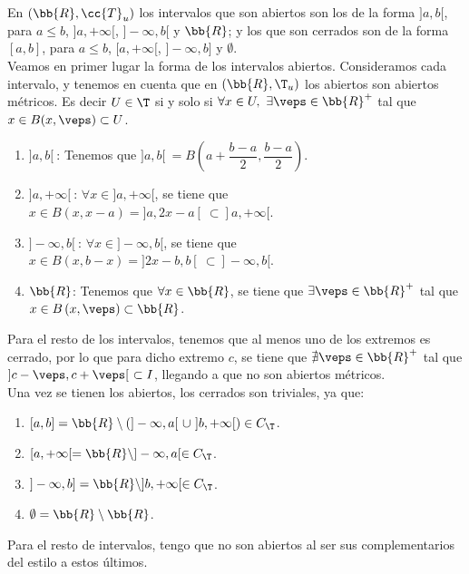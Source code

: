 \begin{ejercicio}
    En $(\bb{R}, \cc{T}_u)$ los intervalos que son abiertos son los de la forma $]a,b[$, para $a\leq b$, $]a,+\infty[$, $]-\infty, b[$ y $\bb{R}$; y los que son cerrados son de la forma $[a,b]$, para $a\leq b$, $[a,+\infty[$, $]-\infty, b]$ y $\emptyset$.\\

    Veamos en primer lugar la forma de los intervalos abiertos. Consideramos cada intervalo, y tenemos en cuenta que en $(\bb{R},\T_u)$ los abiertos son abiertos métricos. Es decir $U\in \T$ si y solo si $\forall x\in U,~\exists \veps\in \bb{R}^+$ tal que $x\in B(x,\veps)\subset U$.
    \begin{enumerate}
        \item $]a,b[~$: Tenemos que $]a,b[~=B\left(a+\dfrac{b-a}{2}, \dfrac{b-a}{2}\right)$.
        \item $]a,+\infty[~$: $\forall x\in ]a,+\infty[$, se tiene que $x\in B\left(x,x-a\right)=]a,2x-a[~\subset ]a,+\infty[$.
        \item $]-\infty,b[~$: $\forall x\in ]-\infty,b[$, se tiene que $x\in B\left(x,b-x\right)=]2x-b,b[~\subset ]-\infty,b[$.
        \item $\bb{R}$: Tenemos que $\forall x\in \bb{R}$, se tiene que $\exists \veps\in \bb{R}^+$ tal que $x\in B\left(x,\veps\right)\subset \bb{R}$.
    \end{enumerate}
    Para el resto de los intervalos, tenemos que al menos uno de los extremos es cerrado, por lo que para dicho extremo $c$, se tiene que $\nexists \veps\in \bb{R}^+$ tal que $]c-\veps, c+\veps[~\subset I$, llegando a que no son abiertos métricos.\\

    Una vez se tienen los abiertos, los cerrados son triviales, ya que:
    \begin{enumerate}
        \item $[a,b]=\bb{R}\setminus \left(]-\infty,a[~\cup~ ]b,+\infty[\right)\in C_\T$.
        \item $[a,+\infty[ = \bb{R}\setminus ]-\infty, a[\in C_\T$.
        \item $]-\infty,b] = \bb{R}\setminus ]b,+\infty[\in C_\T$.
        \item $\emptyset = \bb{R}\setminus \bb{R}$.
    \end{enumerate}
    Para el resto de intervalos, tengo que no son abiertos al ser sus complementarios del estilo a estos últimos.
\end{ejercicio}

